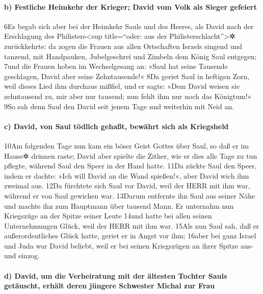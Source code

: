 \hypertarget{b-festliche-heimkehr-der-krieger-david-vom-volk-als-sieger-gefeiert}{%
\paragraph{b) Festliche Heimkehr der Krieger; David vom Volk als Sieger
gefeiert}\label{b-festliche-heimkehr-der-krieger-david-vom-volk-als-sieger-gefeiert}}

6Es begab sich aber bei der Heimkehr Sauls und des Heeres, als David
nach der Erschlagung des Philisters\textless sup title=``oder: aus der
Philisterschlacht''\textgreater✲ zurückkehrte: da zogen die Frauen aus
allen Ortschaften Israels singend und tanzend, mit Handpauken,
Jubelgeschrei und Zimbeln dem König Saul entgegen; 7und die Frauen hoben
im Wechselgesang an: »Saul hat seine Tausende geschlagen, David aber
seine Zehntausende!« 8Da geriet Saul in heftigen Zorn, weil dieses Lied
ihm durchaus mißfiel, und er sagte: »Dem David weisen sie zehntausend
zu, mir aber nur tausend; nun fehlt ihm nur noch das Königtum!« 9So sah
denn Saul den David seit jenem Tage und weiterhin mit Neid an.

\hypertarget{c-david-von-saul-tuxf6dlich-gehauxdft-bewuxe4hrt-sich-als-kriegsheld}{%
\paragraph{c) David, von Saul tödlich gehaßt, bewährt sich als
Kriegsheld}\label{c-david-von-saul-tuxf6dlich-gehauxdft-bewuxe4hrt-sich-als-kriegsheld}}

10Am folgenden Tage nun kam ein böser Geist Gottes über Saul, so daß er
im Hause✲ drinnen raste; David aber spielte die Zither, wie er dies alle
Tage zu tun pflegte, während Saul den Speer in der Hand hatte. 11Da
zückte Saul den Speer, indem er dachte: »Ich will David an die Wand
spießen!«, aber David wich ihm zweimal aus. 12Da fürchtete sich Saul vor
David, weil der HERR mit ihm war, während er von Saul gewichen war.
13Darum entfernte ihn Saul aus seiner Nähe und machte ihn zum Hauptmann
über tausend Mann. Er unternahm nun Kriegszüge an der Spitze seiner
Leute 14und hatte bei allen seinen Unternehmungen Glück, weil der HERR
mit ihm war. 15Als nun Saul sah, daß er außerordentliches Glück hatte,
geriet er in Angst vor ihm; 16aber bei ganz Israel und Juda war David
beliebt, weil er bei seinen Kriegszügen an ihrer Spitze aus- und einzog.

\hypertarget{d-david-um-die-verheiratung-mit-der-uxe4ltesten-tochter-sauls-getuxe4uscht-erhuxe4lt-deren-juxfcngere-schwester-michal-zur-frau}{%
\paragraph{d) David, um die Verheiratung mit der ältesten Tochter Sauls
getäuscht, erhält deren jüngere Schwester Michal zur
Frau}\label{d-david-um-die-verheiratung-mit-der-uxe4ltesten-tochter-sauls-getuxe4uscht-erhuxe4lt-deren-juxfcngere-schwester-michal-zur-frau}}

